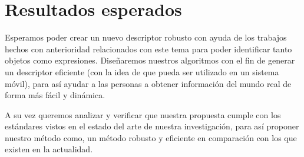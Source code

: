 \documentclass{udparticle}
\begin{document}
\section{Resultados esperados}
Esperamos poder crear un nuevo descriptor robusto con ayuda de los trabajos hechos con anterioridad relacionados con este tema para poder identificar tanto objetos como expresiones. Diseñaremos nuestros algoritmos con el fin de generar un descriptor eficiente (con la idea de que pueda ser utilizado en un sistema móvil), para así ayudar a las personas a obtener información del mundo real de forma más fácil y dinámica.

A su vez queremos analizar y verificar que nuestra propuesta cumple con los estándares vistos en el estado del arte de nuestra investigación, para así proponer nuestro método como, un método robusto y eficiente en comparación con los que existen en la actualidad.
%

\end{document}
